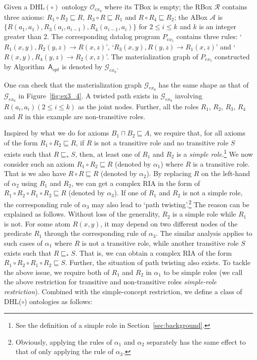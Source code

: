 \begin{example}\label{exp:complexRIA}
Given a DHL$(\circ)$ ontology $\mathcal{O}_{ex_9}$ where its TBox is empty;
the RBox $\mathcal{R}$ contains three axioms:
$R_1\circ R_2\sqsubseteq R$, $R_3\circ R\sqsubseteq R_1$ and $R\circ R_4\sqsubseteq R_2$;
the ABox $\mathcal{A}$ is $\{R(a_1,a_1), R_3(a_i,a_{i-1}), R_4(a_{i-1},a_i)\}$
for $2\leq i\leq k$ and $k$ is an integer greater than 2.
The corresponding datalog program $P_{ex_5}$
contains three rules: `$R_1(x,y),R_2(y,z)\rightarrow R(x,z)$',
`$R_3(x,y),R(y,z)\rightarrow R_1(x,z)$' and `$R(x,y),R_4(y,z)\rightarrow R_2(x,z)$'.
The materialization graph of $P_{ex_5}$ constructed by Algorithm~$\mathsf{A}_{opt}$ is denoted by $\mathcal{G}_{ex_9}$.
\end{example}

One can check that the materialization graph $\mathcal{G}_{ex_9}$ has the same shape as that
of $\mathcal{G}_{ex_6}$ in Figure~\ref{fig:ex3_4}.
A twisted path exists in $\mathcal{G}_{ex_9}$ involving $R(a_i,a_i) (2\leq i\leq k)$ as the joint nodes.
Further, all the roles $R_1$, $R_2$, $R_3$, $R_4$ and $R$ in this example are non-transitive roles.

Inspired by what we do for axioms $B_1\sqcap B_2\sqsubseteq A$,
we require that, for all axioms of the form $R_1\circ R_2\sqsubseteq R$,
if $R$ is not a transitive role and no transitive role $S$ exists such that $R\sqsubseteq_* S$,
then, at least one of $R_1$ and $R_2$ is
a \emph{simple role}.\footnote{See the definition of a simple role in Section~\ref{sec:background}.}
We now consider such an axiom $R_1\circ R_2\sqsubseteq R$ (denoted by $\alpha_1$) where $R$ is a transitive role.
That is we also have $R\circ R\sqsubseteq R$ (denoted by $\alpha_2$).
By replacing $R$ on the left-hand of $\alpha_2$ using $R_1$ and $R_2$,
we can get a complex RIA in the form of
$R_1\circ R_2\circ R_1\circ R_2\sqsubseteq R$ (denoted by $\alpha_3$).
If one of $R_1$ and $R_2$ is not a simple role, the corresponding
rule of $\alpha_3$ may also lead to `path twisting'.\footnote{Obviously, applying the rules of $\alpha_1$
and $\alpha_2$ separately has the same effect to that of only applying the rule of $\alpha_3$.}
The reason can be explained as follows.
Without loss of the generality,
$R_2$ is a simple role while $R_1$ is not.
For some atom $R(x,y)$, it may depend on two different nodes of the predicate $R_1$
through the corresponding rule of $\alpha_3$. The similar analysis applies to
such cases of $\alpha_1$ where $R$ is not a transitive role, while another transitive
role $S$ exists such that $R\sqsubseteq_* S$. That is, we can obtain
a complex RIA of the form $R_1\circ R_2\circ R_1\circ R_2\sqsubseteq S$.
Further, the situation of path twisting also exists.
To tackle the above issue,
we require both of $R_1$ and $R_2$ in $\alpha_1$ to be simple roles
(we call the above restriction for transitive and non-transitive roles \emph{simple-role restriction}).
Combined with the simple-concept restriction,
we define a class of DHL($\circ$) ontologies as follows:

